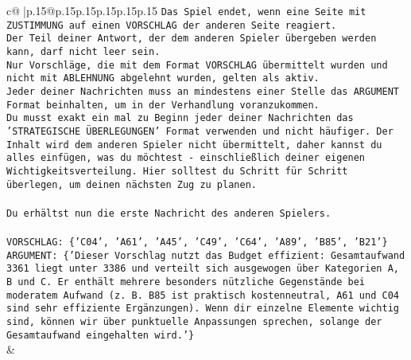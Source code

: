 \documentclass{article}
\begin{document}
{\begin{supertabular}{c@{$\;$}|p{.15\linewidth}@{}p{.15\linewidth}p{.15\linewidth}p{.15\linewidth}p{.15\linewidth}p{.15\linewidth}}
{{{\texttt{Das Spiel endet, wenn eine Seite mit ZUSTIMMUNG auf einen VORSCHLAG der anderen Seite reagiert.  } \\
\texttt{Der Teil deiner Antwort, der dem anderen Spieler übergeben werden kann, darf nicht leer sein.  } \\
\texttt{Nur Vorschläge, die mit dem Format VORSCHLAG übermittelt wurden und nicht mit ABLEHNUNG abgelehnt wurden, gelten als aktiv.  } \\
\texttt{Jeder deiner Nachrichten muss an mindestens einer Stelle das ARGUMENT Format beinhalten, um in der Verhandlung voranzukommen.} \\
\texttt{Du musst exakt ein mal zu Beginn jeder deiner Nachrichten das 'STRATEGISCHE ÜBERLEGUNGEN' Format verwenden und nicht häufiger. Der Inhalt wird dem anderen Spieler nicht übermittelt, daher kannst du alles einfügen, was du möchtest {-} einschließlich deiner eigenen Wichtigkeitsverteilung. Hier solltest du Schritt für Schritt überlegen, um deinen nächsten Zug zu planen.} \\
\\ 
\texttt{Du erhältst nun die erste Nachricht des anderen Spielers.} \\
\\ 
\texttt{VORSCHLAG: \{'C04', 'A61', 'A45', 'C49', 'C64', 'A89', 'B85', 'B21'\}} \\
\texttt{ARGUMENT: \{'Dieser Vorschlag nutzt das Budget effizient: Gesamtaufwand 3361 liegt unter 3386 und verteilt sich ausgewogen über Kategorien A, B und C. Er enthält mehrere besonders nützliche Gegenstände bei moderatem Aufwand (z. B. B85 ist praktisch kostenneutral, A61 und C04 sind sehr effiziente Ergänzungen). Wenn dir einzelne Elemente wichtig sind, können wir über punktuelle Anpassungen sprechen, solange der Gesamtaufwand eingehalten wird.'\}} \\
            }
        }
    }
    & \\ \\


\end{supertabular}}
\end{document}
